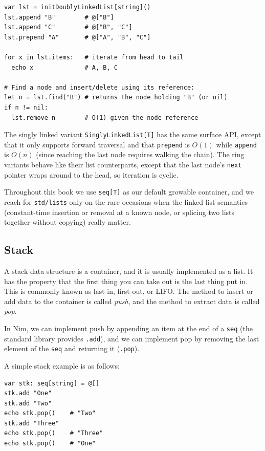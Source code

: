 \documentclass[justified, sixbynine]{tufte-book}
\def\ft{\small\tt}
\theoremstyle{plain}%
\newtheorem * {corollary}{Corollary}
\theoremstyle{definition}
\theoremstyle{remark}
\newtheorem * {remark}{Remark}
\newtheorem * {note}{Note}
\begin{document}
\begin{fullwidth}
\begin{lstlisting}
var lst = initDoublyLinkedList[string]()
lst.append "B"        # @["B"]
lst.append "C"        # @["B", "C"]
lst.prepend "A"       # @["A", "B", "C"]

for x in lst.items:   # iterate from head to tail
  echo x              # A, B, C

# Find a node and insert/delete using its reference:
let n = lst.find("B") # returns the node holding "B" (or nil)
if n != nil:
  lst.remove n        # O(1) given the node reference
\end{lstlisting}

The singly linked variant {\ft SinglyLinkedList[T]} has the same surface API, except that it only supports forward traversal and that {\ft prepend} is $O(1)$ while {\ft append} is $O(n)$ (since reaching the last node requires walking the chain). The ring variants behave like their list counterparts, except that the last node's {\ft next} pointer wraps around to the head, so iteration is cyclic.

Throughout this book we use {\ft seq[T]} as our default growable container, and we reach for {\ft std/lists} only on the rare occasions when the linked-list semantics (constant-time insertion or removal at a known node, or splicing two lists together without copying) really matter.

\goodbreak\subsection{Stack}


A stack data structure is a container, and it is usually implemented as a list. It has the property that the first thing you can take out is the last thing put in. This is commonly known as last-in, first-out, or LIFO. The method to insert or add data to the container is called {\it push}, and the method to extract data is called {\it pop}.

In Nim, we can implement push by appending an item at the end of a {\ft seq} (the standard library provides {\ft .add}), and we can implement pop by removing the last element of the {\ft seq} and returning it ({\ft .pop}).

A simple stack example is as follows:

\begin{lstlisting}
var stk: seq[string] = @[]
stk.add "One"
stk.add "Two"
echo stk.pop()    # "Two"
stk.add "Three"
echo stk.pop()    # "Three"
echo stk.pop()    # "One"
\end{lstlisting}


\end{fullwidth}
\end{document}
